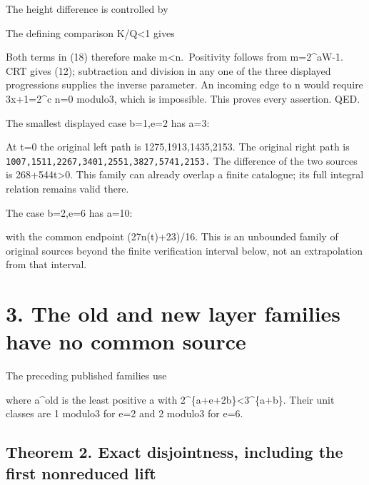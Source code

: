 The height difference is controlled by


The defining comparison K/Q\textless1 gives


Both terms in (18) therefore make m\textless n.~Positivity follows from
m=2\^{}aW-1. CRT gives (12); subtraction and division in any one of the
three displayed progressions supplies the inverse parameter. An incoming
edge to n would require 3x+1=2\^{}c n=0 modulo3, which is impossible.
This proves every assertion. QED.

The smallest displayed case b=1,e=2 has a=3:


At t=0 the original left path is 1275,1913,1435,2153. The original right
path is \nolinkurl{1007,1511,2267,3401,2551,3827,5741,2153.} The
difference of the two sources is 268+544t\textgreater0. This family can
already overlap a finite catalogue; its full integral relation remains
valid there.

The case b=2,e=6 has a=10:


with the common endpoint (27n(t)+23)/16. This is an unbounded family of
original sources beyond the finite verification interval below, not an
extrapolation from that interval.

\section{3. The old and new layer families have no common source}

The preceding published families use


where a\^{}old is the least positive a with
2\^{}\{a+e+2b\}\textless3\^{}\{a+b\}. Their unit classes are 1 modulo3
for e=2 and 2 modulo3 for e=6.

\subsection{Theorem 2. Exact disjointness, including the first
nonreduced lift}

